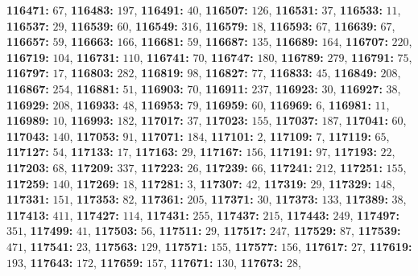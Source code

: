 \textsf{\bfseries 116471:} $67$, \textsf{\bfseries 116483:} $197$, \textsf{\bfseries 116491:} $40$, \textsf{\bfseries 116507:} $126$, \textsf{\bfseries 116531:} $37$, \textsf{\bfseries 116533:} $11$, \textsf{\bfseries 116537:} $29$, \textsf{\bfseries 116539:} $60$, \textsf{\bfseries 116549:} $316$, \textsf{\bfseries 116579:} $18$, \textsf{\bfseries 116593:} $67$, \textsf{\bfseries 116639:} $67$, \textsf{\bfseries 116657:} $59$, \textsf{\bfseries 116663:} $166$, \textsf{\bfseries 116681:} $59$, \textsf{\bfseries 116687:} $135$, \textsf{\bfseries 116689:} $164$, \textsf{\bfseries 116707:} $220$, \textsf{\bfseries 116719:} $104$, \textsf{\bfseries 116731:} $110$, \textsf{\bfseries 116741:} $70$, \textsf{\bfseries 116747:} $180$, \textsf{\bfseries 116789:} $279$, \textsf{\bfseries 116791:} $75$, \textsf{\bfseries 116797:} $17$, \textsf{\bfseries 116803:} $282$, \textsf{\bfseries 116819:} $98$, \textsf{\bfseries 116827:} $77$, \textsf{\bfseries 116833:} $45$, \textsf{\bfseries 116849:} $208$, \textsf{\bfseries 116867:} $254$, \textsf{\bfseries 116881:} $51$, \textsf{\bfseries 116903:} $70$, \textsf{\bfseries 116911:} $237$, \textsf{\bfseries 116923:} $30$, \textsf{\bfseries 116927:} $38$, \textsf{\bfseries 116929:} $208$, \textsf{\bfseries 116933:} $48$, \textsf{\bfseries 116953:} $79$, \textsf{\bfseries 116959:} $60$, \textsf{\bfseries 116969:} $6$, \textsf{\bfseries 116981:} $11$, \textsf{\bfseries 116989:} $10$, \textsf{\bfseries 116993:} $182$, \textsf{\bfseries 117017:} $37$, \textsf{\bfseries 117023:} $155$, \textsf{\bfseries 117037:} $187$, \textsf{\bfseries 117041:} $60$, \textsf{\bfseries 117043:} $140$, \textsf{\bfseries 117053:} $91$, \textsf{\bfseries 117071:} $184$, \textsf{\bfseries 117101:} $2$, \textsf{\bfseries 117109:} $7$, \textsf{\bfseries 117119:} $65$, \textsf{\bfseries 117127:} $54$, \textsf{\bfseries 117133:} $17$, \textsf{\bfseries 117163:} $29$, \textsf{\bfseries 117167:} $156$, \textsf{\bfseries 117191:} $97$, \textsf{\bfseries 117193:} $22$, \textsf{\bfseries 117203:} $68$, \textsf{\bfseries 117209:} $337$, \textsf{\bfseries 117223:} $26$, \textsf{\bfseries 117239:} $66$, \textsf{\bfseries 117241:} $212$, \textsf{\bfseries 117251:} $155$, \textsf{\bfseries 117259:} $140$, \textsf{\bfseries 117269:} $18$, \textsf{\bfseries 117281:} $3$, \textsf{\bfseries 117307:} $42$, \textsf{\bfseries 117319:} $29$, \textsf{\bfseries 117329:} $148$, \textsf{\bfseries 117331:} $151$, \textsf{\bfseries 117353:} $82$, \textsf{\bfseries 117361:} $205$, \textsf{\bfseries 117371:} $30$, \textsf{\bfseries 117373:} $133$, \textsf{\bfseries 117389:} $38$, \textsf{\bfseries 117413:} $411$, \textsf{\bfseries 117427:} $114$, \textsf{\bfseries 117431:} $255$, \textsf{\bfseries 117437:} $215$, \textsf{\bfseries 117443:} $249$, \textsf{\bfseries 117497:} $351$, \textsf{\bfseries 117499:} $41$, \textsf{\bfseries 117503:} $56$, \textsf{\bfseries 117511:} $29$, \textsf{\bfseries 117517:} $247$, \textsf{\bfseries 117529:} $87$, \textsf{\bfseries 117539:} $471$, \textsf{\bfseries 117541:} $23$, \textsf{\bfseries 117563:} $129$, \textsf{\bfseries 117571:} $155$, \textsf{\bfseries 117577:} $156$, \textsf{\bfseries 117617:} $27$, \textsf{\bfseries 117619:} $193$, \textsf{\bfseries 117643:} $172$, \textsf{\bfseries 117659:} $157$, \textsf{\bfseries 117671:} $130$, \textsf{\bfseries 117673:} $28$, 
